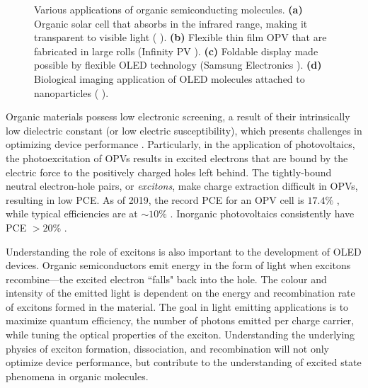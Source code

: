 \begin{figure}[h]
    
    \caption[Various applications of organic semiconducting materials. \textbf{(a)} Organic solar cell that absorbs in the infrared range, making it transparent to visible light. \textbf{(b)} Flexible thin film {OPV} that are fabricated in large rolls (Infinity PV). \textbf{(c)} Foldable display made possible by flexible {OLED} technology (Samsung Electronics). \textbf{(d)} Biological imaging application of {OLED} molecules attached to nanoparticles.]{Various applications of organic semiconducting molecules. \textbf{(a)} Organic solar cell that absorbs in the infrared range, making it transparent to visible light (\citeauthor{zhao2014near} \citep{zhao2014near}). \textbf{(b)} Flexible thin film {OPV} that are fabricated in large rolls (Infinity PV \citep{jacobyInfinityPV}). \textbf{(c)} Foldable display made possible by flexible {OLED} technology (Samsung Electronics \citep{galaxyFold}). \textbf{(d)} Biological imaging application of {OLED} molecules attached to nanoparticles (\citeauthor{crossley2017post} \citep{crossley2017post}).  }
    \label{fig:intro:applications}
\end{figure}

Organic materials possess low electronic screening, a result of their intrinsically low dielectric constant (or low electric susceptibility), which presents challenges in optimizing device performance \citep{gregg2003comparing}. Particularly, in the application of photovoltaics, the photoexcitation of \acp{OPV} results in excited electrons that are bound by the electric force to the positively charged holes left behind. The tightly-bound neutral electron-hole pairs, or \emph{excitons}, make charge extraction difficult in \acp{OPV}, resulting in low \ac{PCE}. As of 2019, the record \ac{PCE} for an \ac{OPV} cell is $17.4\%$ \citep{Meng2018,Cui2019}, while typical efficiencies are at $\sim 10\%$ \citep{NREL2019champion}. Inorganic photovoltaics consistently have \ac{PCE} $> 20\%$ \citep{NREL2019research}.



Understanding the role of excitons is also important to the development of \ac{OLED} devices. Organic semiconductors emit energy in the form of light when excitons recombine---the excited electron ``falls" back into the hole. The colour and intensity of the emitted light is dependent on the energy and recombination rate of excitons formed in the material. The goal in light emitting applications is to maximize quantum efficiency, the number of photons emitted per charge carrier, while tuning the optical properties of the exciton. Understanding the underlying physics of exciton formation, dissociation, and recombination will not only optimize device performance, but contribute to the understanding of excited state phenomena in organic molecules.


